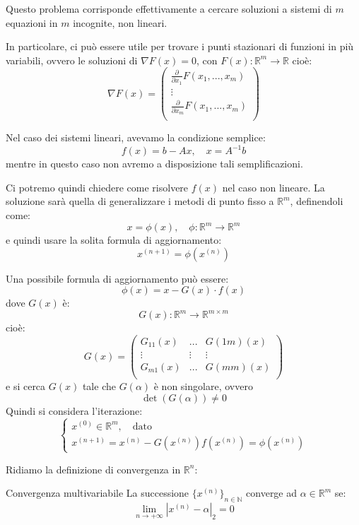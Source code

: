 \documentclass[a4paper,11pt]{article}
\begin{document}
Questo problema corrisponde effettivamente a cercare soluzioni a sistemi di $m$ equazioni in $m$ incognite, non lineari.

\par\smallskip

In particolare, ci può essere utile per trovare i punti stazionari di funzioni in più variabili, ovvero le soluzioni di $\nabla F(x) = 0$, con $F(x) : \mathbb{R}^m \rightarrow \mathbb{R}$ cioè:
$$
\nabla F(x) = 
\begin{pmatrix}
	\frac{\partial }{\partial x_1} F(x_1, ..., x_m) \\
	\vdots \\ 
	\frac{\partial }{\partial x_m} F(x_1, ..., x_m) \\
\end{pmatrix}
$$

\par\smallskip

Nel caso dei sistemi lineari, avevamo la condizione semplice:
$$
f(x) = b - Ax, \quad x = A^{-1} b
$$
mentre in questo caso non avremo a disposizione tali semplificazioni.

Ci potremo quindi chiedere come risolvere $f(x)$ nel caso non lineare.
La soluzione sarà quella di generalizzare i metodi di punto fisso a $\mathbb{R}^m$, definendoli come:
$$
x = \phi(x), \quad \phi : \mathbb{R}^m \rightarrow \mathbb{R}^m
$$
e quindi usare la solita formula di aggiornamento:
$$
x^{(n + 1)} = \phi(x^{(n)})
$$

Una possibile formula di aggiornamento può essere:
$$
\phi(x) = x - G(x) \cdot f(x)
$$
dove $G(x)$ è:
$$
G(x) : \mathbb{R}^m \rightarrow \mathbb{R}^{m \times m}
$$
cioè:
$$
G(x) =
\begin{pmatrix}
	G_{11}(x) & ... & G(1m)(x) \\
	\vdots & \vdots & \vdots \\
	G_{m1}(x) & ... & G(mm)(x) \\
\end{pmatrix}
$$
e si cerca $G(x)$ tale che $G(\alpha)$ è non singolare, ovvero 
$$
\det(G(\alpha)) \neq 0
$$
Quindi si considera l'iterazione:
\[
	\begin{cases}
		x^{(0)} \in \mathbb{R}^m, \quad \text{dato} \\
		x^{(n + 1)} = x^{(n)} - G(x^{(n)}) f(x^{(n)}) = \phi (x^{(n)})
	\end{cases}
\]

Ridiamo la definizione di convergenza in $\mathbb{R}^n$:
\begin{definition}{Convergenza multivariabile}
	La successione $\{x^{(n)}\}_{n \in \mathbb{N}}$ converge ad $\alpha \in \mathbb{R}^m$ se:
	$$
	\lim_{n \rightarrow + \infty} | x^{(n)} - \alpha|_2 = 0
	$$
\end{definition}
\end{document}

